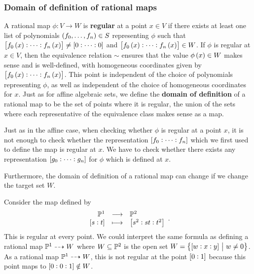 \subsubsection{Domain of definition of rational maps}


\begin{definition*}
A rational map $ \phi : V \to W $ is \textbf{regular} at a point $ x \in V $ if there exists at least one list of polynomials $ \br{f_0, \dots, f_n} \in S $ representing $ \phi $ such that $ \sbr{f_0\br{x} : \dots : f_n\br{x}} \ne \sbr{0 : \dots : 0} $ and $ \sbr{f_0\br{x} : \dots : f_n\br{x}} \in W $. If $ \phi $ is regular at $ x \in V $, then the equivalence relation $ \sim $ ensures that the value $ \phi\br{x} \in W $ makes sense and is well-defined, with homogeneous coordinates given by $ \sbr{f_0\br{x} : \dots : f_n\br{x}} $. This point is independent of the choice of polynomials representing $ \phi $, as well as independent of the choice of homogeneous coordinates for $ x $. Just as for affine algebraic sets, we define the \textbf{domain of definition} of a rational map to be the set of points where it is regular, the union of the sets where each representative of the equivalence class makes sense as a map.
\end{definition*}

\begin{note*}
Just as in the affine case, when checking whether $ \phi $ is regular at a point $ x $, it is not enough to check whether the representation $ \sbr{f_0 : \dots : f_n} $ which we first used to define the map is regular at $ x $. We have to check whether there exists any representation $ \sbr{g_0 : \dots : g_n} $ for $ \phi $ which is defined at $ x $.
\end{note*}

\begin{note*}
Furthermore, the domain of definition of a rational map can change if we change the target set $ W $.
\end{note*}

\begin{example*}
Consider the map defined by
$$ \function{\PP^1}{\PP^2}{\sbr{s : t}}{\sbr{s^2 : st : t^2}}. $$
This is regular at every point. We could interpret the same formula as defining a rational map $ \mathbb{P}^1 \dashrightarrow W $ where $ W \subseteq \mathbb{P}^2 $ is the open set $ W = \cbr{\sbr{w : x : y} \st w \ne 0} $. As a rational map $ \mathbb{P}^1 \dashrightarrow W $, this is not regular at the point $ \sbr{0 : 1} $ because this point maps to $ \sbr{0 : 0 : 1} \notin W $.
\end{example*}

